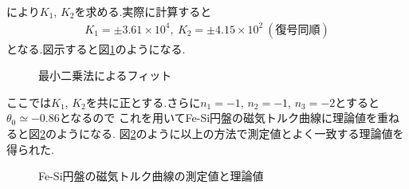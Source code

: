 により$K_1$, $K_2$を求める.実際に計算すると
\begin{align}
  K_1=\pm3.61\times10^4,\ K_2=\pm4.15\times10^2\ (復号同順)
\end{align}
となる.図示すると図\ref{fig:cons_FeSi_fit}のようになる.
\begin{figure}[hptb]
  \begin{center}
    
    \caption{最小二乗法によるフィット}
    \label{fig:cons_FeSi_fit}
  \end{center}
\end{figure}
ここでは$K_1$, $K_2$を共に正とする.さらに$n_1=-1$, $n_2=-1$, $n_3=-2$とすると$\theta_0\simeq-0.86$となるので
これを用いてFe-Si円盤の磁気トルク曲線に理論値を重ねると図\ref{fig:cons_FeSi_torque_fit}のようになる.
図\ref{fig:cons_FeSi_torque_fit}のように以上の方法で測定値とよく一致する理論値を得られた.
\begin{figure}[hptb]
  \begin{center}
    
    \caption{Fe-Si円盤の磁気トルク曲線の測定値と理論値}
    \label{fig:cons_FeSi_torque_fit}
  \end{center}
\end{figure}